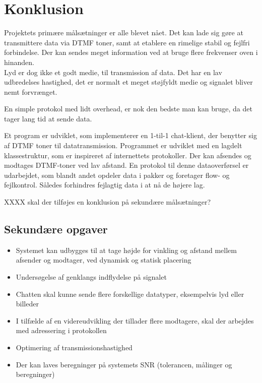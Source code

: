 \section{Konklusion}
Projektets primære målsætninger er alle blevet nået.
Det kan lade sig gøre at transmittere data via DTMF toner, samt at etablere en rimelige stabil og fejlfri forbindelse. Der kan sendes meget information ved at bruge flere frekvenser oven i hinanden.\\
Lyd er dog ikke et godt medie, til transmission af data. Det har en lav udbredelses hastighed, det er normalt et meget støjfyldt medie og signalet bliver nemt forvrænget.

En simple protokol med lidt overhead, er nok den bedste man kan bruge, da det tager lang tid at sende data. %





Et program er udviklet, som implementerer en 1-til-1 chat-klient, der benytter sig af DTMF toner til datatransmission. Programmet er udviklet med en lagdelt klassestruktur, som er inspireret af internettets protokoller. Der kan afsendes og modtages DTMF-toner ved lav afstand. En protokol til denne dataoverførsel er udarbejdet, som blandt andet opdeler data i pakker og foretager flow- og fejlkontrol. Således forhindres fejlagtig data i at nå de højere lag.









XXXX skal der tilføjes en konklusion på sekundære målsætninger?
\subsection{Sekundære opgaver}
\begin{itemize}[noitemsep]
\item Systemet kan udbygges til at tage højde for vinkling og afstand mellem afsender og modtager, ved dynamisk og statisk placering
\item Undersøgelse af genklangs indflydelse på signalet
\item Chatten skal kunne sende flere forskellige datatyper, eksempelvis lyd eller billeder
\item I tilfælde af en videreudvikling der tillader flere modtagere, skal der arbejdes med adressering i protokollen
\item Optimering af transmissionshastighed
\item Der kan laves beregninger på systemets SNR (tolerancen, målinger og beregninger)
\end{itemize}